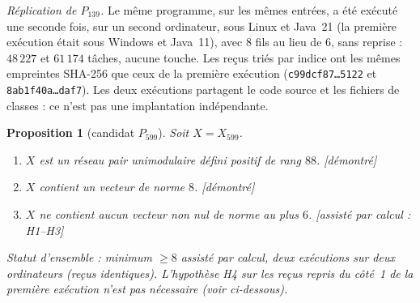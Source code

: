 \documentclass[11pt,a4paper]{amsart}
\theoremstyle{plain}
\newtheorem{proposition}[theoreme]{Proposition}
\theoremstyle{definition}
\numberwithin{equation}{section}
\newcommand{\st}[1]{\textup{\textsf{\small[#1]}}}
\newcommand{\DEM}{\st{démontré}}
\begin{document}
\emph{Réplication de $P_{139}$.} Le même programme, sur les mêmes entrées, a été exécuté une seconde fois, sur un second ordinateur, sous Linux et Java~21 (la première exécution était sous Windows et Java~11), avec $8$ fils au lieu de $6$, sans reprise : $48\,227$ et $61\,174$ tâches, aucune touche. Les reçus triés par indice ont les mêmes empreintes SHA-256 que ceux de la première exécution (\texttt{c99dcf87\dots5122} et \texttt{8ab1f40a\dots daf7}). Les deux exécutions partagent le code source et les fichiers de classes : ce n'est pas une implantation indépendante.

\begin{proposition}[candidat $P_{599}$]\label{prop:P599}
Soit $X=X_{599}$.
\begin{enumerate}[label=\textup{(\arabic*)}]
\item $X$ est un réseau pair unimodulaire défini positif de rang $88$. \DEM
\item $X$ contient un vecteur de norme $8$. \DEM
\item $X$ ne contient aucun vecteur non nul de norme au plus $6$. \st{assisté par calcul : H1--H3}
\end{enumerate}
Statut d'ensemble : minimum $\ge8$ assisté par calcul, deux exécutions sur deux ordinateurs (reçus identiques). L'hypothèse H4 sur les reçus repris du côté~1 de la première exécution n'est pas nécessaire (voir ci-dessous).
\end{proposition}
\end{document}
